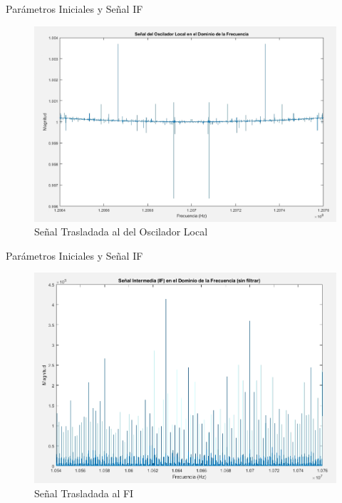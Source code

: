 \documentclass[mathserif,spanish]{beamer}
\begin{document}
\begin{frame}{Parámetros Iniciales y Señal IF}
 
    \begin{figure}[h]
        \centering
        \includegraphics[scale=0.25]{signal_1207.png}
        \caption{Señal Trasladada al del Oscilador Local}
    \end{figure}
    
\end{frame}

\begin{frame}{Parámetros Iniciales y Señal IF}
 
    \begin{figure}[h]
        \centering
        \includegraphics[scale=0.25]{signal_107.png}
        \caption{Señal Trasladada al FI}
    \end{figure}
    
\end{frame}
\end{document}
